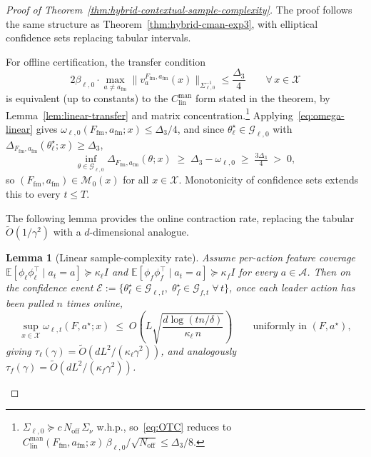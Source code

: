 \documentclass{article}
\newcommand{\cA}{\mathcal{A}}
\newcommand{\cX}{\mathcal{X}}
\newcommand{\cG}{\mathcal{G}}
\newcommand{\cM}{\mathcal{M}}
\newcommand{\E}{\mathbb{E}}           %
\newcommand{\cE}{\mathcal{E}}
\newtheorem{lemma}[theorem]{Lemma}
\begin{document}
\begin{proof}[Proof of Theorem~\ref{thm:hybrid-contextual-sample-complexity}]
The proof follows the same structure as Theorem~\ref{thm:hybrid-cman-exp3}, with elliptical confidence sets replacing tabular intervals.

For offline certification, the transfer condition
\begin{equation}
\label{eq:OTC}
    2\beta_{\ell,0}\cdot\max_{a\neq a_{\mathrm{fm}}} \|v_a^{F_{\mathrm{fm}},a_{\mathrm{fm}}}(x)\|_{\Sigma_{\ell,0}^{-1}}  \le \frac{\Delta_3}{4} \qquad\forall\, x\in\cX
    \tag{OTC}
\end{equation}
is equivalent (up to constants) to the $C^{\mathrm{man}}_{\mathrm{lin}}$ form stated in the theorem, by Lemma~\ref{lem:linear-transfer} and matrix concentration.\footnote{$\Sigma_{\ell,0}\succeq c\,N_{\mathrm{off}}\,\Sigma_\nu$ w.h.p., so~\eqref{eq:OTC} reduces to $C^{\mathrm{man}}_{\mathrm{lin}}(F_{\mathrm{fm}},a_{\mathrm{fm}};x)\,\beta_{\ell,0}/\sqrt{N_{\mathrm{off}}}\le\Delta_3/8$.} Applying~\eqref{eq:omega-linear} gives $\omega_{\ell,0}(F_{\mathrm{fm}},a_{\mathrm{fm}};x)\le\Delta_3/4$, and since $\theta_\ell^\star\in\cG_{\ell,0}$ with $\Delta_{F_{\mathrm{fm}},a_{\mathrm{fm}}}(\theta_\ell^\star;x)\ge\Delta_3$,
\[
    \inf_{\theta\in\cG_{\ell,0}} \Delta_{F_{\mathrm{fm}},a_{\mathrm{fm}}}(\theta;x) \;\ge\;\Delta_3 - \omega_{\ell,0} \;\ge\;\tfrac{3\Delta_3}{4}\;>\;0,
\]
so $(F_{\mathrm{fm}},a_{\mathrm{fm}})\in\cM_0(x)$ for all $x\in\cX$. Monotonicity of confidence sets extends this to every $t\le T$.

The following lemma provides the online contraction rate, replacing the tabular $\widetilde O(1/\gamma^2)$ with a $d$-dimensional analogue.

\begin{lemma}[Linear sample-complexity rate]
\label{lem:tau-linear-rate}
Assume per-action feature coverage $\E[\phi_\ell\phi_\ell^\top\mid a_t=a]\succeq\kappa_\ell I$ and $\E[\phi_f\phi_f^\top\mid a_t=a]\succeq\kappa_f I$ for every $a\in\cA$. Then on the confidence event $\cE:=\{\theta_\ell^\star\in\cG_{\ell,t},\;\theta_f^\star\in\cG_{f,t}\;\forall\,t\}$, once each leader action has been pulled $n$ times online,
\[
    \sup_{x\in\cX}\omega_{\ell,t}(F,a^\star;x) \;\le\; O\!\left(L\sqrt{\frac{d\log(tn/\delta)}{\kappa_\ell\,n}}\right) \qquad\text{uniformly in }(F,a^\star),
\]
giving $\tau_\ell(\gamma)=\widetilde O(dL^2/(\kappa_\ell\gamma^2))$, and analogously $\tau_f(\gamma)=\widetilde O(dL^2/(\kappa_f\gamma^2))$.
\end{lemma}


\end{proof}
\end{document}
